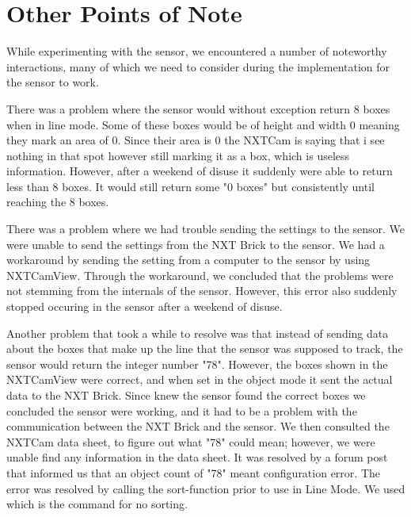 
\section{Other Points of Note} \label{noteworthyCam}
While experimenting with the sensor, we encountered a number of noteworthy interactions, many of which we need to consider during the implementation for the sensor to work. 



There was a problem where the sensor would without exception return 8 boxes when in line mode. Some of these boxes would be of height and width 0 meaning they mark an area of 0. Since their area is 0 the NXTCam is saying that i see nothing in that spot however still marking it as a box, which is useless information. However, after a weekend of disuse it suddenly were able to return less than 8 boxes. It would still return some "0 boxes" but consistently until reaching the 8 boxes. 

There was a problem where we had trouble sending the settings to the sensor. We were unable to send the settings from the NXT Brick to the sensor. We had a workaround by sending the setting from a computer to the sensor by using NXTCamView. Through the workaround, we concluded that the problems were not stemming from the internals of the sensor. However, this error also suddenly stopped occuring in the sensor after a weekend of disuse.


Another problem that took a while to resolve was that instead of sending data about the boxes that make up the line that the sensor was supposed to track, the sensor would return the integer number "78". However, the boxes shown in the NXTCamView were correct, and when set in the object mode it sent the actual data to the NXT Brick. Since knew the sensor found the correct boxes we concluded the sensor were working, and it had to be a problem with the communication between the NXT Brick and the sensor. We then consulted the NXTCam data sheet, to figure out what "78" could mean; however, we were unable find any information in the data sheet. It was resolved by a forum post that informed us that an object count of "78" meant configuration error. The error was resolved by calling the sort-function prior to use in Line Mode. We used  which is the command for no sorting. 

